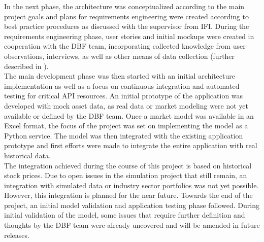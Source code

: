 In the next phase, the architecture was conceptualized according to the main project goals and plans for requirements engineering were created according to best practice procedures as discussed with the supervisor from IFI. During the requirements engineering phase, user stories and initial mockups were created in cooperation with the DBF team, incorporating collected knowledge from user observations, interviews, as well as other means of data collection (further described in ).\\

The main development phase was then started with an initial architecture implementation as well as a focus on continuous integration and automated testing for critical API resources. An initial prototype of the application was developed with mock asset data, as real data or market modeling were not yet available or defined by the DBF team. Once a market model was available in an Excel format, the focus of the project was set on implementing the model as a Python service. The model was then integrated with the existing application prototype and first efforts were made to integrate the entire application with real historical data. \\

The integration achieved during the course of this project is based on historical stock prices. Due to open issues in the simulation project that still remain, an integration with simulated data or industry sector portfolios was not yet possible. However, this integration is planned for the near future. Towards the end of the project, an initial model validation and application testing phase followed. During initial validation of the model, some issues that require further definition and thoughts by the DBF team were already uncovered and will be amended in future releases. \\



